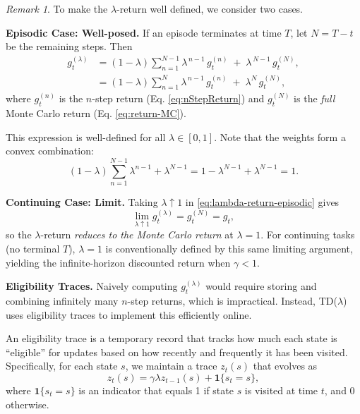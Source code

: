 \documentclass[
]{book}
\theoremstyle{definition}
\theoremstyle{definition}
\theoremstyle{definition}
\theoremstyle{definition}
\theoremstyle{remark}
\newtheorem*{remark}{Remark}
\begin{document}
\begin{remark}
To make the \(\lambda\)-return well defined, we consider two cases.

\textbf{Episodic Case: Well-posed.} If an episode terminates at time \(T\), let \(N=T-t\) be the remaining steps. Then
\begin{equation}
\begin{split}
g_t^{(\lambda)}
& =
(1-\lambda)\sum_{n=1}^{N-1}\lambda^{\,n-1} \, g_t^{(n)}
\;+\;
\lambda^{\,N-1}\, g_t^{(N)}, \\
& = (1-\lambda)\sum_{n=1}^{N}\lambda^{\,n-1} \, g_t^{(n)}
\;+\;
\lambda^{N}\, g_t^{(N)},
\end{split}
\label{eq:lambda-return-episodic}
\end{equation}
where \(g_t^{(n)}\) is the \(n\)-step return (Eq. \eqref{eq:nStepReturn}) and \(g_t^{(N)}\) is the \emph{full} Monte Carlo return (Eq. \eqref{eq:return-MC}).

This expression is well-defined for all \(\lambda\in[0,1]\). Note that the weights form a convex combination:
\[
(1-\lambda)\sum_{n=1}^{N-1}\lambda^{n-1} + \lambda^{N-1}
= 1-\lambda^{N-1}+\lambda^{N-1} = 1.
\]

\textbf{Continuing Case: Limit.} Taking \(\lambda\uparrow 1\) in \eqref{eq:lambda-return-episodic} gives
\[
\lim_{\lambda\uparrow 1} g_t^{(\lambda)}
= g_t^{(N)} = g_t,
\]
so the \(\lambda\)-return \emph{reduces to the Monte Carlo return} at \(\lambda=1\). For continuing tasks (no terminal \(T\)), \(\lambda=1\) is conventionally defined by this same limiting argument, yielding the infinite-horizon discounted return when \(\gamma<1\).
\end{remark}

\textbf{Eligibility Traces.} Naively computing \(g_t^{(\lambda)}\) would require storing and combining infinitely many \(n\)-step returns, which is impractical. Instead, TD(\(\lambda\)) uses eligibility traces to implement this efficiently online.

An eligibility trace is a temporary record that tracks how much each state is ``eligible'' for updates based on how recently and frequently it has been visited. Specifically, for each state \(s\), we maintain a trace \(z_t(s)\) that evolves as
\begin{equation}
z_t(s) = \gamma \lambda z_{t-1}(s) + \mathbf{1}\{s_t = s\},
\label{eq:EligibilityTrace}
\end{equation}
where \(\mathbf{1}\{s_t = s\}\) is an indicator that equals 1 if state \(s\) is visited at time \(t\), and 0 otherwise.
\end{document}
